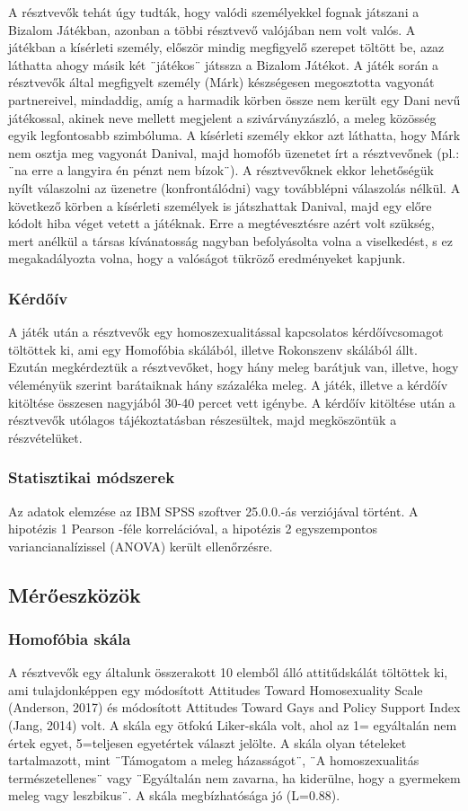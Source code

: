 A résztvevők tehát úgy tudták, hogy valódi személyekkel fognak játszani a Bizalom Játékban, azonban a többi résztvevő valójában nem volt valós. A játékban a kísérleti személy, először mindig megfigyelő szerepet töltött be, azaz láthatta ahogy másik két ¨játékos¨ játssza a Bizalom Játékot. A játék során a résztvevők által megfigyelt személy (Márk) készségesen megosztotta vagyonát partnereivel, mindaddig, amíg a harmadik körben össze nem került egy Dani nevű játékossal, akinek neve mellett megjelent a szivárványzászló, a meleg közösség egyik legfontosabb szimbóluma. A kísérleti személy ekkor azt láthatta, hogy Márk nem osztja meg vagyonát Danival, majd homofób üzenetet írt a résztvevőnek (pl.: ¨na erre a langyira én pénzt nem bízok¨). A résztvevőknek ekkor lehetőségük nyílt válaszolni az üzenetre (konfrontálódni) vagy továbblépni válaszolás nélkül. A következő körben a kísérleti személyek is játszhattak Danival, majd egy előre kódolt hiba véget vetett a játéknak. Erre a megtévesztésre azért volt szükség, mert anélkül a társas kívánatosság nagyban befolyásolta volna a viselkedést, s  ez megakadályozta volna, hogy a valóságot tükröző eredményeket kapjunk.


\subsubsection{Kérdőív}
A játék után a résztvevők egy homoszexualitással kapcsolatos kérdőívcsomagot töltöttek ki, ami egy Homofóbia skálából, illetve Rokonszenv skálából állt. Ezután megkérdeztük a résztvevőket, hogy hány meleg barátjuk van, illetve, hogy véleményük szerint barátaiknak hány százaléka meleg. A játék, illetve a kérdőív kitöltése összesen nagyjából 30-40 percet vett igénybe. A kérdőív kitöltése után a résztvevők utólagos tájékoztatásban részesültek, majd megköszöntük a részvételüket. 

\subsubsection{Statisztikai módszerek}
Az adatok elemzése az IBM SPSS szoftver 25.0.0.-ás verziójával történt. A hipotézis 1 Pearson -féle korrelációval, a hipotézis 2 egyszempontos variancianalízissel (ANOVA) került ellenőrzésre. 

\subsection{Mérőeszközök}
\subsubsection{Homofóbia skála}
A résztvevők egy általunk összerakott 10 elemből álló attitűdskálát töltöttek ki, ami tulajdonképpen egy módosított Attitudes Toward Homosexuality Scale (Anderson, 2017) és módosított Attitudes Toward Gays and Policy Support Index (Jang, 2014) volt. A skála egy ötfokú Liker-skála volt, ahol az 1= egyáltalán nem értek egyet, 5=teljesen egyetértek választ jelölte. A skála olyan tételeket tartalmazott, mint ¨Támogatom a meleg házasságot¨, ¨A homoszexualitás természetellenes¨ vagy ¨Egyáltalán nem zavarna, ha kiderülne, hogy a gyermekem meleg vagy leszbikus¨. A skála megbízhatósága jó (L=0.88).

